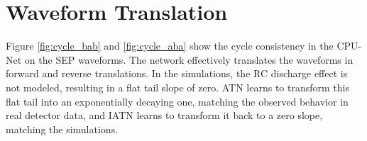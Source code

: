 

\section{Waveform Translation}
Figure \ref{fig:cycle_bab} and \ref{fig:cycle_aba} show the cycle consistency in the CPU-Net on the SEP waveforms. The network effectively translates the waveforms in forward and reverse translations. In the {\siggen} simulations, the RC discharge effect is not modeled, resulting in a flat tail slope of zero. ATN learns to transform this flat tail into an exponentially decaying one, matching the observed behavior in real detector data, and IATN learns to transform it back to a zero slope, matching the simulations.


